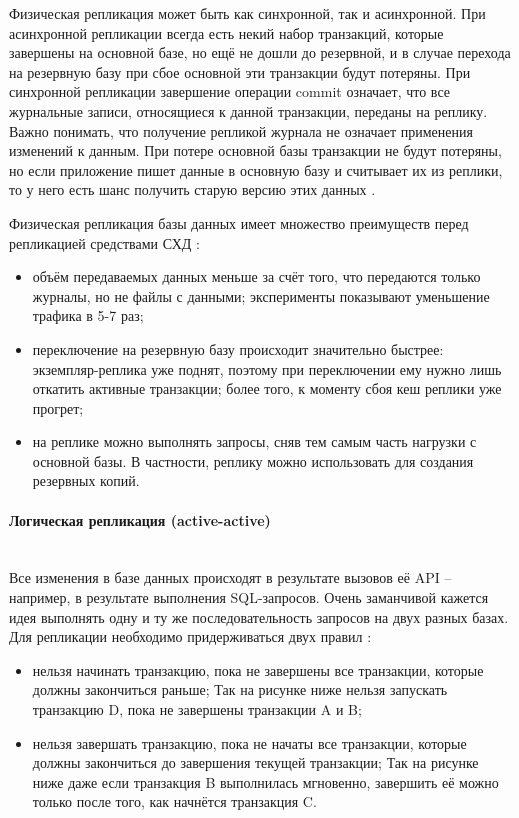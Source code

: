 Физическая репликация может быть как синхронной, так и асинхронной. При асинхронной репликации всегда есть некий набор
транзакций, которые завершены на основной базе, но ещё не дошли до резервной, и в случае перехода на резервную базу при
сбое основной эти транзакции будут потеряны. При синхронной репликации завершение операции commit означает, что все
журнальные записи, относящиеся к данной транзакции, переданы на реплику. Важно понимать, что получение репликой журнала
не означает применения изменений к данным. При потере основной базы транзакции не будут потеряны, но если приложение
пишет данные в основную базу и считывает их из реплики, то у него есть шанс получить старую версию этих данных \autocite{PhysLogPeplic}.

Физическая репликация базы данных имеет множество преимуществ перед репликацией средствами СХД \autocite{PhysLogPeplic}:
\begin{itemize}
    \item объём передаваемых данных меньше за счёт того, что передаются только журналы, но не файлы с данными; эксперименты показывают уменьшение трафика в 5-7 раз;
    \item переключение на резервную базу происходит значительно быстрее: экземпляр-реплика уже поднят, поэтому при переключении ему нужно лишь откатить активные транзакции; более того, к моменту сбоя кеш реплики уже прогрет;
    \item на реплике можно выполнять запросы, сняв тем самым часть нагрузки с основной базы. В частности, реплику можно использовать для создания резервных копий.
\end{itemize}

\paragraph{Логическая репликация (active-active)} ~\\
Все изменения в базе данных происходят в результате вызовов её API – например, в результате выполнения SQL-запросов.
Очень заманчивой кажется идея выполнять одну и ту же последовательность запросов на двух разных базах. Для репликации
необходимо придерживаться двух правил \autocite{PhysLogPeplic}:
\begin{itemize}
    \item нельзя начинать транзакцию, пока не завершены все транзакции, которые должны закончиться раньше; Так на рисунке ниже нельзя запускать транзакцию D, пока не завершены транзакции A и B;
    \item нельзя завершать транзакцию, пока не начаты все транзакции, которые должны закончиться до завершения текущей транзакции; Так на рисунке ниже даже если транзакция B выполнилась мгновенно, завершить её можно только после того, как начнётся транзакция C.
\end{itemize}

